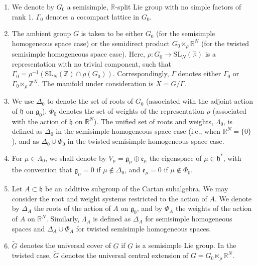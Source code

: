 \documentclass[11pt]{amsart}
\numberwithin{equation}{section}
\theoremstyle{plain}
\begin{document}
\begin{enumerate}
    \item We denote by $G_0$ a semisimple, $\mathbb{R}$-split Lie group with no simple factors of rank 1. $\Gamma_0$ denotes a cocompact lattice in $G_0$.

    \item The ambient group $G$ is taken to be either $G_0$ (for the semisimple homogeneous space case) or the semidirect product $G_0\ltimes_\rho \mathbb{R}^N$ (for the twisted semisimple homogeneous space case). Here, $\rho: G_0 \to \mathrm{SL}_N(\mathbb{R})$ is a representation with no trivial component, such that $\Gamma_0=\rho^{-1}( \mathrm{SL}_N(\mathbb{Z})\cap \rho(G_0))$. Correspondingly, $\Gamma$ denotes either $\Gamma_0$ or $\Gamma_0\ltimes_\rho \mathbb{Z}^N$. The manifold under consideration is $X=G/\Gamma$.

    \item We use $\Delta_0$ to denote the set of roots of $G_0$ (associated with the adjoint action of $\mathfrak{h}$ on $\mathfrak{g}_0$). $\Phi_0$ denotes the set of weights of the representation $\rho$ (associated with the action of $\mathfrak{h}$ on $\mathbb{R}^N$).
    The unified set of roots and weights, $\Lambda_0$, is defined as $\Delta_0$ in the semisimple homogeneous space case (i.e., when $\mathbb{R}^N=\{0\}$), and as $\Delta_0\cup \Phi_0$ in the twisted semisimple homogeneous space case.

    \item For $\mu\in \Lambda_0$, we shall  denote by $V_\mu=\mathfrak g_\mu\oplus \mathfrak e_\mu$ the eigenspace of $\mu\in \mathfrak h^*$, with the convention that \(\mathfrak g_\mu=0\) if \(\mu\notin\Delta_0\),
and \(\mathfrak e_\mu=0\) if \(\mu\notin\Phi_0\).

    \item Let $A \subset \mathfrak{h}$ be an additive subgroup of the Cartan subalgebra. We may consider the root and weight systems restricted to the action of $A$. We denote by $\Delta_A$ the roots of the action of $A$ on $\mathfrak{g}_0$, and by $\Phi_A$ the weights of the action of $A$ on $\mathbb{R}^N$.
    Similarly, $\Lambda_A$ is defined as $\Delta_A$ for semisimple homogeneous spaces and $\Delta_A \cup \Phi_A$ for twisted semisimple homogeneous spaces.

    \item $\widetilde{G}$ denotes the universal cover of $G$ if $G$ is a semisimple Lie group. In the twisted case, $\widetilde{G}$ denotes the universal central extension of $G=G_0\ltimes_\rho \mathbb{R}^N$.
\end{enumerate}
\end{document}
